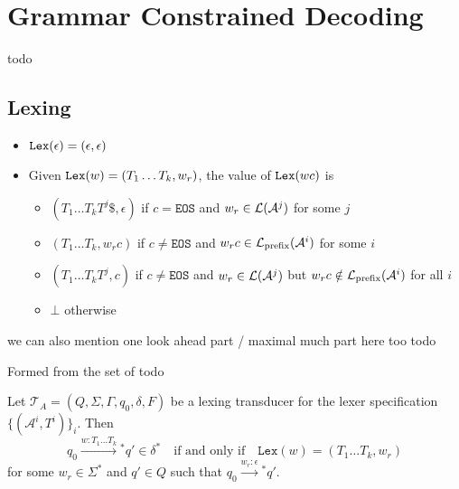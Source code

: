 \section{Grammar Constrained Decoding}

\begin{definition}[Detokenizer]
    \label{def:Detokenizer}
    todo
\end{definition}

\subsection{Lexing}
\begin{definition}
    \label{def:PartialLexer}
    \begin{itemize}
    \item $\mathtt{Lex}(\epsilon) = (\epsilon, \epsilon)$
    \item Given $\mathtt{Lex}(w) = (T_1 \ldots T_k, w_r)$, the value of $\mathtt{Lex}(wc)$ is
        \begin{itemize}
        \item $(T_1 \ldots T_k T^j \$, \epsilon)$ if $c = \texttt{EOS}$ and $w_r \in \mathcal{L}(\mathcal{A}^j)$ for some $j$
        \item $(T_1 \ldots T_k, w_r c)$ if $c \neq \texttt{EOS}$ and $w_r c \in \mathcal{L}_{\mathrm{prefix}}(\mathcal{A}^i)$ for some $i$
        \item $(T_1 \ldots T_k T^j, c)$ if $c \neq \texttt{EOS}$ and $w_r \in \mathcal{L}(\mathcal{A}^j)$ but $w_r c \notin \mathcal{L}_{\mathrm{prefix}}(\mathcal{A}^i)$ for all $i$
        \item $\bot$ otherwise %
        \end{itemize}
    \end{itemize}
\end{definition}

\begin{theorem}
    \label{thm:LexSplit}
    we can also mention one look ahead part / maximal much part here too
    todo 
\end{theorem}

\begin{definition}
    \label{def:Lexing Transducer}
    Formed from the set of 
    todo
\end{definition}


\begin{theorem}
    \label{thm:LexingTransducerLexEquiv}
    Let \(\mathcal{T}_A = (Q, \Sigma, \Gamma, q_0, \delta, F)\) be a lexing transducer for the lexer specification \(\{(\mathcal{A}^i, T^i)\}_i\). Then 
\[
    q_0 \xrightarrow{w : T_1 \ldots T_k}{}^* q' \in \delta^* \quad \text{if and only if} \quad \texttt{Lex}(w) = (T_1 \ldots T_k, w_r)
    \]
    for some \(w_r \in \Sigma^*\) and \(q' \in Q\) such that \(q_0 \xrightarrow{w_r : \epsilon}{}^* q'\).
\end{theorem}

